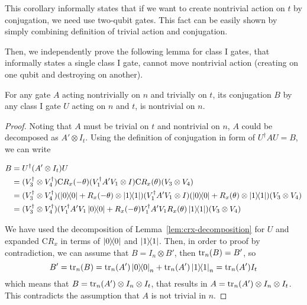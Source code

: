 This corollary informally states that if we want to create nontrivial action on $t$ by conjugation, we need use two-qubit gates. This fact can be easily shown by simply combining definition of trivial action and conjugation.

Then, we independently prove the following lemma for class I gates, that informally states a single class I gate, cannot move nontrivial action (creating on one qubit and destroying on another).

\begin{lemma}\label{lem:no-move-class-i}
  For any gate $A$ acting nontrivially on $n$ and trivially on $t$, its conjugation $B$ by any class I gate $U$ acting on $n$ and $t$, is nontrivial on $n$.
\end{lemma}
\begin{proof}
  Noting that $A$ must be trivial on $t$ and nontrivial on $n$, $A$ could be decomposed as $A' \otimes I_t$.
  Using the definition of conjugation in form of $U^\dagger A U = B$, we can write

  \begin{equation}
    \begin{aligned}
    B &= U^\dagger (A' \otimes I_t) U  \\
    &= (V_3^\dagger \otimes V_4^\dagger)\mathrm{C}R_x(-\theta) (V_1^\dagger A' V_1 \otimes I) \mathrm{C}R_x(\theta) (V_3 \otimes V_4) \\
    &= (V_3^\dagger \otimes V_4^\dagger)(\dyad{0} + R_x(-\theta) \otimes \dyad{1}) (V_1^\dagger A' V_1 \otimes I) (\dyad{0} + R_x(\theta) \otimes \dyad{1}) (V_3 \otimes V_4) \\
    &= (V_3^\dagger \otimes V_4^\dagger)(V_1^\dagger A' V_1 \dyad{0} + R_x(-\theta) V_1^\dagger A' V_1 R_x(\theta) \dyad{1}) (V_3 \otimes V_4)
    \end{aligned}
  \end{equation}

  We have used the decomposition of Lemma~\ref{lem:crx-decomposition} for $U$ and expanded $\mathrm{C}R_x$ in terms of $\dyad{0}$ and $\dyad{1}$. Then, in order to proof by contradiction, we can assume that $B = I_n \otimes B'$, then $\tr_n(B) = B'$, so
  \begin{equation}
    B' = \tr_n(B) = \tr_n(A') \dyad{0}_n + \tr_n(A') \dyad{1}_n = \tr_n(A') I_t
  \end{equation}
  which means that $B = \tr_n(A') \otimes I_n \otimes I_t$, that results in $A = \tr_n(A') \otimes I_n \otimes I_t$. This contradicts the assumption that $A$ is not trivial in $n$.
\end{proof}

